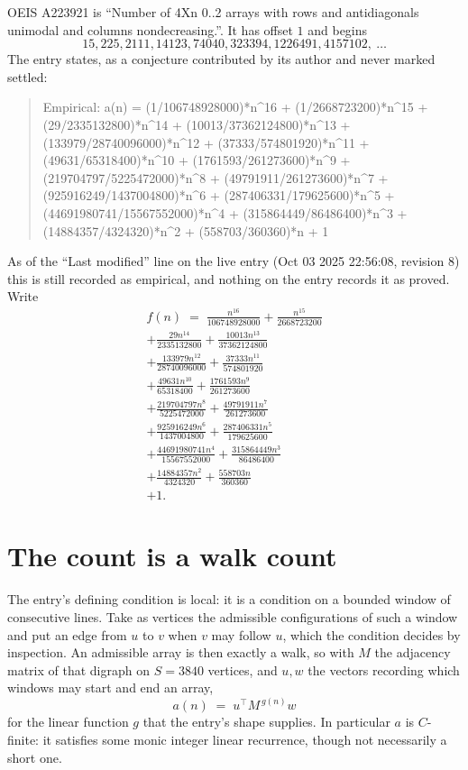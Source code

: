 \documentclass[11pt,a4paper]{article}
\theoremstyle{plain}
\theoremstyle{definition}
\begin{document}
OEIS A223921 is ``Number of 4Xn 0..2 arrays with rows and antidiagonals unimodal and columns nondecreasing.''. It has offset $1$ and begins
\[
15, 225, 2111, 14123, 74040, 323394, 1226491, 4157102,\ \dots
\]
The entry states, as a conjecture contributed by its author and never marked settled:
\begin{quote}\raggedright\small
Empirical: a(n) = (1/106748928000)*n\^{}16 + (1/2668723200)*n\^{}15 + (29/2335132800)*n\^{}14 + (10013/37362124800)*n\^{}13 + (133979/28740096000)*n\^{}12 + (37333/574801920)*n\^{}11 + (49631/65318400)*n\^{}10 + (1761593/261273600)*n\^{}9 + (219704797/5225472000)*n\^{}8 + (49791911/261273600)*n\^{}7 + (925916249/1437004800)*n\^{}6 + (287406331/179625600)*n\^{}5 + (44691980741/15567552000)*n\^{}4 + (315864449/86486400)*n\^{}3 + (14884357/4324320)*n\^{}2 + (558703/360360)*n + 1
\end{quote}
As of the ``Last modified'' line on the live entry (Oct 03 2025 22:56:08, revision 8) this is still
recorded as empirical, and nothing on the entry records it as proved. Write
\begin{multline*}
f(n)\;=\;\frac{n^{16}}{106748928000} + \frac{n^{15}}{2668723200} \\
+ \frac{29 n^{14}}{2335132800} + \frac{10013 n^{13}}{37362124800} \\
+ \frac{133979 n^{12}}{28740096000} + \frac{37333 n^{11}}{574801920} \\
+ \frac{49631 n^{10}}{65318400} + \frac{1761593 n^{9}}{261273600} \\
+ \frac{219704797 n^{8}}{5225472000} + \frac{49791911 n^{7}}{261273600} \\
+ \frac{925916249 n^{6}}{1437004800} + \frac{287406331 n^{5}}{179625600} \\
+ \frac{44691980741 n^{4}}{15567552000} + \frac{315864449 n^{3}}{86486400} \\
+ \frac{14884357 n^{2}}{4324320} + \frac{558703 n}{360360} \\
+ 1.
\end{multline*}

\section{The count is a walk count}

The entry's defining condition is local: it is a condition on a bounded window of consecutive lines. Take as vertices the
admissible configurations of such a window and put an edge from $u$ to $v$ when $v$ may
follow $u$, which the condition decides by inspection. An admissible array is then exactly a
walk, so with $M$ the adjacency matrix of that digraph on $S=3840$ vertices, and $u,w$ the
vectors recording which windows may start and end an array,
\[
a(n)\;=\;u^{\!\top}M^{\,g(n)}w
\]
for the linear function $g$ that the entry's shape supplies. In particular $a$ is
$C$-finite: it satisfies some monic integer linear recurrence, though not necessarily a short
one.
\end{document}
